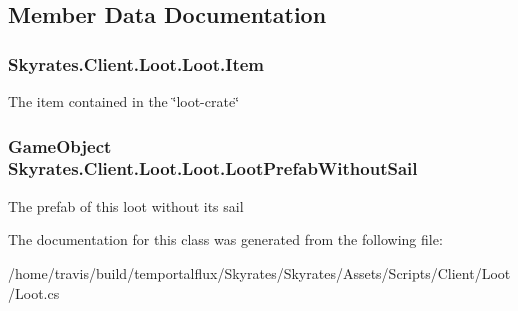 \subsection{Member Data Documentation}
\hypertarget{class_skyrates_1_1_client_1_1_loot_1_1_loot_a295eba520dd781c17f67c70799aa2322}{
\subsubsection[{Item}]{ Skyrates.\-Client.\-Loot.\-Loot.\-Item}}\label{class_skyrates_1_1_client_1_1_loot_1_1_loot_a295eba520dd781c17f67c70799aa2322}


The item contained in the \char`\"{}loot-\/crate\char`\"{} 

\hypertarget{class_skyrates_1_1_client_1_1_loot_1_1_loot_ad63bdbaca44faa51af93fc8f480206b4}{
\subsubsection[{Loot\-Prefab\-Without\-Sail}]{\setlength{\rightskip}{0pt plus 5cm}Game\-Object Skyrates.\-Client.\-Loot.\-Loot.\-Loot\-Prefab\-Without\-Sail}}\label{class_skyrates_1_1_client_1_1_loot_1_1_loot_ad63bdbaca44faa51af93fc8f480206b4}


The prefab of this loot without its sail 



The documentation for this class was generated from the following file\-:\begin{DoxyCompactItemize}
\item 
/home/travis/build/temportalflux/\-Skyrates/\-Skyrates/\-Assets/\-Scripts/\-Client/\-Loot/Loot.\-cs\end{DoxyCompactItemize}
